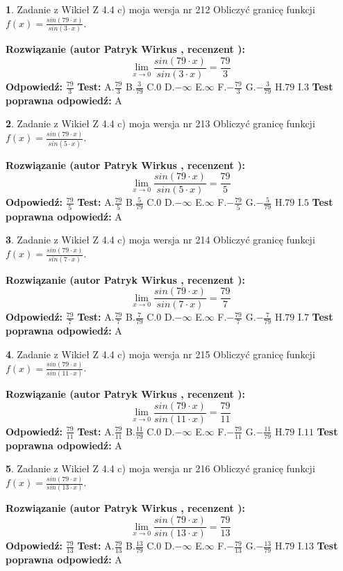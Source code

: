 \documentclass[12pt, a4paper]{article}
\theoremstyle{definition} %
\newtheorem{zad}{}
\newcommand{\zadStart}[1]{\begin{zad}#1\newline}
\newcommand{\zadStop}{\end{zad}}
\newcommand{\rozwStart}[2]{\noindent \textbf{Rozwiązanie (autor #1 , recenzent #2): }\newline}
\newcommand{\rozwStop}{\newline}
\newcommand{\odpStart}{\noindent \textbf{Odpowiedź:}\newline}
\newcommand{\odpStop}{\newline}
\newcommand{\testStart}{\noindent \textbf{Test:}\newline}
\newcommand{\testStop}{\newline}
\newcommand{\kluczStart}{\noindent \textbf{Test poprawna odpowiedź:}\newline}
\newcommand{\kluczStop}{\newline}
\begin{document}
\zadStart{Zadanie z Wikieł Z 4.4 c) moja wersja nr 212}
Obliczyć granicę funkcji $f(x)=\frac{sin(79\cdot x)}{sin(3\cdot x)}$.
\zadStop
\rozwStart{Patryk Wirkus}{}
$$\lim\limits_{x\to 0}\frac{sin(79\cdot x)}{sin(3\cdot x)}=
\frac{79}{3}$$
\rozwStop
\odpStart
$\frac{79}{3}$
\odpStop
\testStart
A.$\frac{79}{3}$
B.$\frac{3}{79}$
C.$0$
D.$-\infty$
E.$\infty$
F.$-\frac{79}{3}$
G.$-\frac{3}{79}$
H.$79$
I.$3$
\testStop
\kluczStart
A
\kluczStop



\zadStart{Zadanie z Wikieł Z 4.4 c) moja wersja nr 213}
Obliczyć granicę funkcji $f(x)=\frac{sin(79\cdot x)}{sin(5\cdot x)}$.
\zadStop
\rozwStart{Patryk Wirkus}{}
$$\lim\limits_{x\to 0}\frac{sin(79\cdot x)}{sin(5\cdot x)}=
\frac{79}{5}$$
\rozwStop
\odpStart
$\frac{79}{5}$
\odpStop
\testStart
A.$\frac{79}{5}$
B.$\frac{5}{79}$
C.$0$
D.$-\infty$
E.$\infty$
F.$-\frac{79}{5}$
G.$-\frac{5}{79}$
H.$79$
I.$5$
\testStop
\kluczStart
A
\kluczStop



\zadStart{Zadanie z Wikieł Z 4.4 c) moja wersja nr 214}
Obliczyć granicę funkcji $f(x)=\frac{sin(79\cdot x)}{sin(7\cdot x)}$.
\zadStop
\rozwStart{Patryk Wirkus}{}
$$\lim\limits_{x\to 0}\frac{sin(79\cdot x)}{sin(7\cdot x)}=
\frac{79}{7}$$
\rozwStop
\odpStart
$\frac{79}{7}$
\odpStop
\testStart
A.$\frac{79}{7}$
B.$\frac{7}{79}$
C.$0$
D.$-\infty$
E.$\infty$
F.$-\frac{79}{7}$
G.$-\frac{7}{79}$
H.$79$
I.$7$
\testStop
\kluczStart
A
\kluczStop



\zadStart{Zadanie z Wikieł Z 4.4 c) moja wersja nr 215}
Obliczyć granicę funkcji $f(x)=\frac{sin(79\cdot x)}{sin(11\cdot x)}$.
\zadStop
\rozwStart{Patryk Wirkus}{}
$$\lim\limits_{x\to 0}\frac{sin(79\cdot x)}{sin(11\cdot x)}=
\frac{79}{11}$$
\rozwStop
\odpStart
$\frac{79}{11}$
\odpStop
\testStart
A.$\frac{79}{11}$
B.$\frac{11}{79}$
C.$0$
D.$-\infty$
E.$\infty$
F.$-\frac{79}{11}$
G.$-\frac{11}{79}$
H.$79$
I.$11$
\testStop
\kluczStart
A
\kluczStop



\zadStart{Zadanie z Wikieł Z 4.4 c) moja wersja nr 216}
Obliczyć granicę funkcji $f(x)=\frac{sin(79\cdot x)}{sin(13\cdot x)}$.
\zadStop
\rozwStart{Patryk Wirkus}{}
$$\lim\limits_{x\to 0}\frac{sin(79\cdot x)}{sin(13\cdot x)}=
\frac{79}{13}$$
\rozwStop
\odpStart
$\frac{79}{13}$
\odpStop
\testStart
A.$\frac{79}{13}$
B.$\frac{13}{79}$
C.$0$
D.$-\infty$
E.$\infty$
F.$-\frac{79}{13}$
G.$-\frac{13}{79}$
H.$79$
I.$13$
\testStop
\kluczStart
A
\kluczStop
\end{document}
